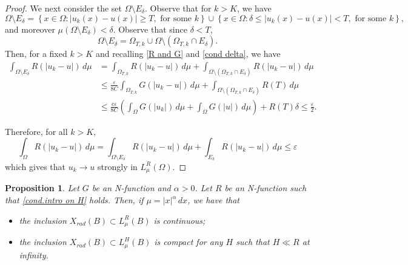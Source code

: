 \documentclass[leqno,twoside, 12pt]{amsart}
\theoremstyle{plain}
\numberwithin{equation}{section} \numberwithin{figure}{section}
\newtheorem{proposition}[theorem]{Proposition}
\theoremstyle{definition}
\numberwithin{equation}{section}
\begin{document}
\begin{proof}
We next consider the set $\Omega\setminus E_{\delta}$.  Observe that  for $k> K$, we have 
$$
\Omega\setminus E_{\delta} = \left\lbrace x\in \Omega: |u_k(x)-u(x)|\geq T, \text{ for some }k\right\rbrace \cup \left\lbrace x\in \Omega: \delta \leq |u_k(x)-u(x)|< T, \text{ for some }k\right\rbrace,
$$
and moreover $\mu(\Omega\setminus E_{\delta})<\delta$. Observe that since $\delta<T$,
$$\Omega\setminus E_{\delta}= \Omega_{T, k} \cup \Omega \setminus (\Omega_{T, k}\cap E_{\delta}).$$  Then, for a fixed $k>K$ and recalling \eqref{R and G} and \eqref{cond delta}, we have
\begin{equation}
\begin{split}
\int_{\Omega\setminus E_\delta} R(|u_k-u|)\,d\mu& =   \int_{\Omega_{T, k}} R(|u_k-u|)\,d\mu + \int_{\Omega \setminus (\Omega_{T, k}\cap E_\delta)} R(|u_k-u|)\,d\mu\\ & \leq 
 \frac{\varepsilon}{8C}\int_{\Omega_{T, k}} G(|u_k-u|)\,d\mu + \int_{\Omega \setminus (\Omega_{T, k}\cap E_\delta)} R(T)\,d\mu\\ & \leq  \frac{c\varepsilon}{8C}\left( \int_{\Omega} G(|u_k|)\,d\mu  + \int_\Omega G(|u|)\,d\mu\right)+R(T)\delta
 \leq \frac{\varepsilon}{2}.
\end{split}
\end{equation}

\medskip



Therefore, for all $k>K$,
$$
\int_\Omega R(|u_k-u|)\,d\mu = \int_{\Omega\setminus E_\delta} R(|u_k-u|)\,d\mu + \int_{E_\delta} R(|u_k-u|)\,d\mu \leq \varepsilon
$$
which gives that $u_k\to u$ strongly in $L_{\mu}^R(\Omega)$.
\end{proof}

\begin{proposition} \label{prop.1}
Let $G$ be an N-function and $\alpha>0$. Let $R$ be an N-function such that \eqref{cond.intro on H} holds. Then, if $\mu= |x|^\alpha\,dx$, we have that
\begin{itemize}
\item[(i)]the inclusion $X_{rad}(B)\subset L_{\mu}^R(B)$ is continuous;
\item[(ii)] the inclusion $X_{rad}(B)\subset L_{\mu}^H(B)$ is compact for any $H$ such that $H\ll R$ at infinity.
\end{itemize} 
\end{proposition}
\end{document}
